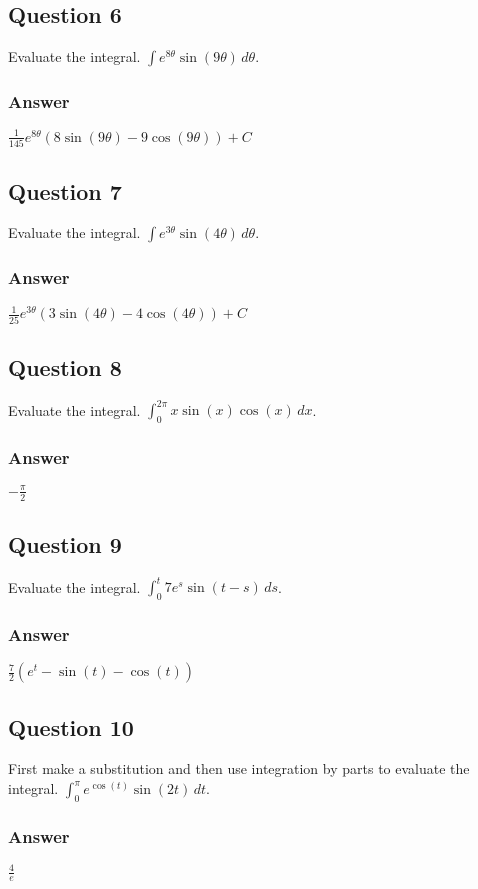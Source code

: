 \documentclass{article}
\begin{document}
\subsection*{Question 6}
Evaluate the integral. $\int e^{8\theta}\sin(9\theta) \,d\theta$.
\subsubsection*{Answer}
$ \frac{1}{145}e^{8\theta}(8\sin(9\theta) - 9\cos(9\theta)) + C $

\subsection*{Question 7}
Evaluate the integral. $\int e^{3\theta}\sin(4\theta) \,d\theta$.
\subsubsection*{Answer}
$ \frac{1}{25}e^{3\theta}(3\sin(4\theta) - 4\cos(4\theta)) + C $

\subsection*{Question 8}
Evaluate the integral. $\int_0^{2\pi} x\sin(x)\cos(x) \,dx$.
\subsubsection*{Answer}
$ -\frac{\pi}{2} $

\subsection*{Question 9}
Evaluate the integral. $\int_0^t 7e^s \sin(t-s) \,ds$.
\subsubsection*{Answer}
$ \frac{7}{2}(e^t - \sin(t) - \cos(t)) $

\subsection*{Question 10}
First make a substitution and then use integration by parts to evaluate the integral. $\int_0^\pi e^{\cos(t)}\sin(2t) \,dt$.
\subsubsection*{Answer}
$ \frac{4}{e} $
\end{document}
